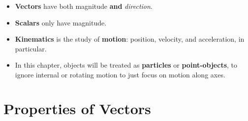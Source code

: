 \documentclass[openany]{book}
\begin{document}
\begin{itemize}
\item {\bfseries{Vectors}} have both magnitude {\bfseries{and}} \textit{direction}.
\item {\bfseries{Scalars}} only have magnitude.
\item {\bfseries{Kinematics}} is the study of {\bfseries{motion}}: position, velocity, and acceleration, in particular.
\item In this chapter, objects will be treated as {\bfseries{particles}} or {\bfseries{point-objects}}, to ignore internal or rotating motion to just focus on motion along axes.
\end{itemize}

\section{Properties of Vectors}
\end{document}
